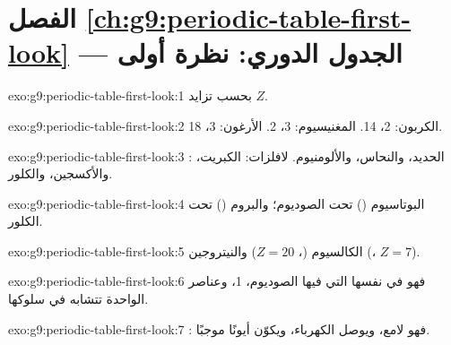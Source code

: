 \section*{الفصل \ref{ch:g9:periodic-table-first-look} --- الجدول الدوري: نظرة أولى}

\begin{solution}{exo:g9:periodic-table-first-look:1}
بحسب تزايد  $Z$.
\end{solution}

\begin{solution}{exo:g9:periodic-table-first-look:2}
الكربون:  2،  14. المغنيسيوم:  3،  2. الأرغون:
 3،  18.
\end{solution}

\begin{solution}{exo:g9:periodic-table-first-look:3}
: الحديد، والنحاس، والألومنيوم. لافلزات: الكبريت، والأكسجين، والكلور.
\end{solution}

\begin{solution}{exo:g9:periodic-table-first-look:4}
البوتاسيوم () تحت الصوديوم؛ والبروم () تحت الكلور.
\end{solution}

\begin{solution}{exo:g9:periodic-table-first-look:5}
الكالسيوم (، $Z = 20$) والنيتروجين (، $Z = 7$).
\end{solution}

\begin{solution}{exo:g9:periodic-table-first-look:6}
فهو في  نفسها التي فيها الصوديوم،  1، وعناصر  الواحدة
تتشابه في سلوكها.
\end{solution}

\begin{solution}{exo:g9:periodic-table-first-look:7}
: فهو لامع، ويوصل الكهرباء، ويكوّن أيونًا موجبًا.
\end{solution}

